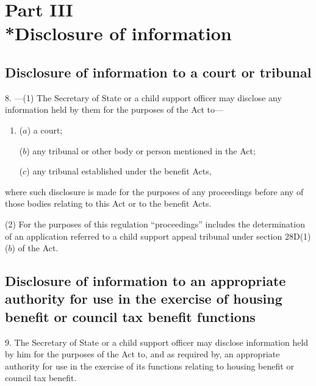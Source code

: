 \documentclass[a4paper,12pt]{article}
\begin{document}
\section[Part III --- Disclosure of information]{Part III\\*Disclosure of information}

\renewcommand\parthead{--- Part III}

\subsection[8. Disclosure of information to a court or tribunal]{Disclosure of information to a court or tribunal}

8.%
---(1)  %
  The Secretary of State or a child support officer may disclose any information held by them for the purposes of the Act to—
\begin{enumerate}\item[]
($a$) a court;

($b$) any tribunal or other body or person mentioned in the Act;

($c$) any tribunal established under the benefit Acts,
\end{enumerate}
where such disclosure is made for the purposes of any proceedings before any of those bodies relating to this Act or to the benefit Acts.

(2) For the purposes of this regulation “proceedings” includes the determination of an application referred to a child support appeal tribunal under section 28D(1)($b$) of the Act.


\subsection[9. Disclosure of information to an appropriate authority for use in the exercise of housing benefit or council tax benefit functions]{Disclosure of information to an appropriate authority for use in the exercise of housing benefit or council tax benefit functions}

9.  The Secretary of State or a child support officer may disclose information held by him for the purposes of the Act to, and as required by, an appropriate authority for use in the exercise of its functions relating to housing benefit or council tax benefit.
\end{document}
